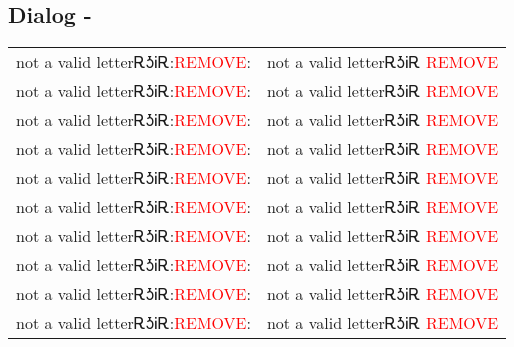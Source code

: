 \subsection{Dialog - }
\begin{tabular}{p{2cm} p{11cm}}
not a valid letterᎡᎼᎥᎡ:\newline \textcolor{red}{REMOVE}: & not a valid letterᎡᎼᎥᎡ 
\newline\textcolor{red}{REMOVE}\\
not a valid letterᎡᎼᎥᎡ:\newline \textcolor{red}{REMOVE}: & not a valid letterᎡᎼᎥᎡ 
\newline\textcolor{red}{REMOVE}\\
not a valid letterᎡᎼᎥᎡ:\newline \textcolor{red}{REMOVE}: & not a valid letterᎡᎼᎥᎡ 
\newline\textcolor{red}{REMOVE}\\
not a valid letterᎡᎼᎥᎡ:\newline \textcolor{red}{REMOVE}: & not a valid letterᎡᎼᎥᎡ 
\newline\textcolor{red}{REMOVE}\\
not a valid letterᎡᎼᎥᎡ:\newline \textcolor{red}{REMOVE}: & not a valid letterᎡᎼᎥᎡ 
\newline\textcolor{red}{REMOVE}\\
not a valid letterᎡᎼᎥᎡ:\newline \textcolor{red}{REMOVE}: & not a valid letterᎡᎼᎥᎡ 
\newline\textcolor{red}{REMOVE}\\
not a valid letterᎡᎼᎥᎡ:\newline \textcolor{red}{REMOVE}: & not a valid letterᎡᎼᎥᎡ 
\newline\textcolor{red}{REMOVE}\\
not a valid letterᎡᎼᎥᎡ:\newline \textcolor{red}{REMOVE}: & not a valid letterᎡᎼᎥᎡ 
\newline\textcolor{red}{REMOVE}\\
not a valid letterᎡᎼᎥᎡ:\newline \textcolor{red}{REMOVE}: & not a valid letterᎡᎼᎥᎡ 
\newline\textcolor{red}{REMOVE}\\
not a valid letterᎡᎼᎥᎡ:\newline \textcolor{red}{REMOVE}: & not a valid letterᎡᎼᎥᎡ 
\newline\textcolor{red}{REMOVE}\\
\end{tabular}
